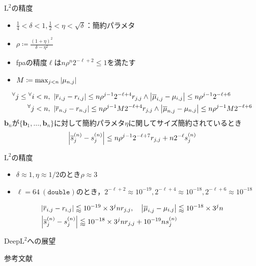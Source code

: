 \documentclass[12pt,aspectratio=169,table,dvipdfmx, leqno]{beamer}
\begin{document}
\begin{frame}{$\text{L}^2$の精度}
\begin{itemize}
    \item $\frac{1}{4}<\delta<1, \frac{1}{2}<\eta<\sqrt{\delta}$：簡約パラメタ
    \item $\rho\coloneqq \frac{(1+\eta)^2}{\delta-\eta^2}$
    \item fpaの精度$\ell$は$n\rho^n 2^{-\ell+2}\le 1$を満たす
    \item $M\coloneqq \max_{j<n} \abs{\mu_{n, j}}$
\end{itemize}
\begin{align}
    {}^\forall j\le{}^\forall i<n&,~\abs{\overline{r}_{i, j}-r_{i, j}}\le n\rho^{j-1}2^{-\ell+4}r_{j, j}\land \abs{\overline{\mu}_{i, j}-\mu_{i, j}}\le n\rho^{j-1}2^{-\ell+6}\\
    {}^\forall j < n&,~\abs{\overline{r}_{n, j}-r_{n, j}}\le n\rho^{j-1}M2^{-\ell+4}r_{j, j}\land \abs{\overline{\mu}_{n, j}-\mu_{n, j}}\le n\rho^{j-1}M2^{-\ell+6}
\end{align}
$\bm{b}_n$が$\{\bm{b}_1,\ldots,\bm{b}_n\}$に対して簡約パラメタ$\eta$に関してサイズ簡約されているとき
\begin{equation}
    \abs{\overline{s}_{j}^{(n)}-s_{j}^{(n)}}\le n\rho^{j-1}2^{-\ell+7}r_{j, j}+n2^{-\ell}s_{j}^{(n)}
\end{equation}
\end{frame}

\begin{frame}{$\text{L}^2$の精度}
\begin{itemize}
    \item $\delta\approx 1, \eta\approx 1/2$のとき$\rho\approx 3$
    \item $\ell=64~(\texttt{double})$のとき，$2^{-\ell+2}\approx 10^{-19}, 2^{-\ell+4}\approx 10^{-18}, 2^{-\ell+6}\approx 10^{-18}$
\end{itemize}
\begin{align*}
&\abs{\overline{r}_{i, j}-r_{i, j}}\lessapprox 10^{-19}\times 3^jn r_{j, j}, \quad\abs{\overline{\mu}_{i, j}-\mu_{i, j}}\lessapprox 10^{-18}\times 3^{j}n\\
&\abs{\overline{s}_{j}^{(n)}-s_{j}^{(n)}}\lessapprox 10^{-18}\times 3^j nr_{j, j}+10^{-19}ns_{j}^{(n)}
\end{align*}
\end{frame}

\begin{frame}{$\text{DeepL}^2$への展望}

\end{frame}

\begin{frame}[allowframebreaks]{参考文献}
\beamertemplatetextbibitems

\typeout{}

\end{frame}
\end{document}
